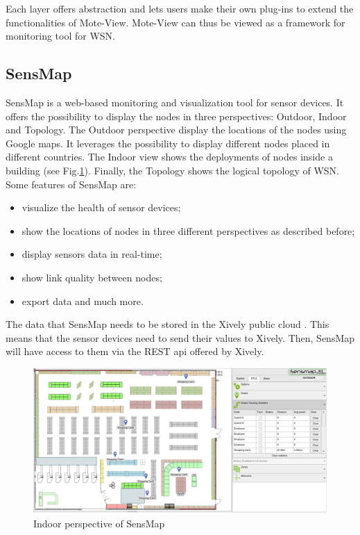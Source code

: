 Each layer offers abstraction and lets users make their own plug-ins to extend the functionalities of Mote-View. Mote-View can thus be viewed as a framework for monitoring tool for WSN.

\subsection{SensMap}

SensMap \cite{mraz2014visualization} is a web-based monitoring and visualization tool for sensor devices. It offers the possibility to display the nodes in three perspectives: Outdoor, Indoor and Topology. The Outdoor perspective display the locations of the nodes using Google maps. It leverages the possibility to display different nodes placed in different countries. The Indoor view shows the deployments of nodes inside a building (see Fig.\ref{fig:sensmap}). Finally, the Topology shows the logical topology of WSN.\\

Some features of SensMap are:

\begin{itemize}
  \item visualize the health of sensor devices;
  \item show the locations of nodes in three different perspectives as described before;
  \item display sensors data in real-time;
  \item show link quality between nodes;
  \item export data and much more.
\end{itemize}

The data that SensMap needs to be stored in the Xively public cloud \cite{website:xively}. This means that the sensor devices need to send their values to Xively. Then, SensMap will have access to them via the REST api offered by Xively.

\begin{figure}
  \centering
  \includegraphics[width=\textwidth]{res/sensmap.jpg}
  \caption{Indoor perspective of SensMap}
  \label{fig:sensmap}
\end{figure}

